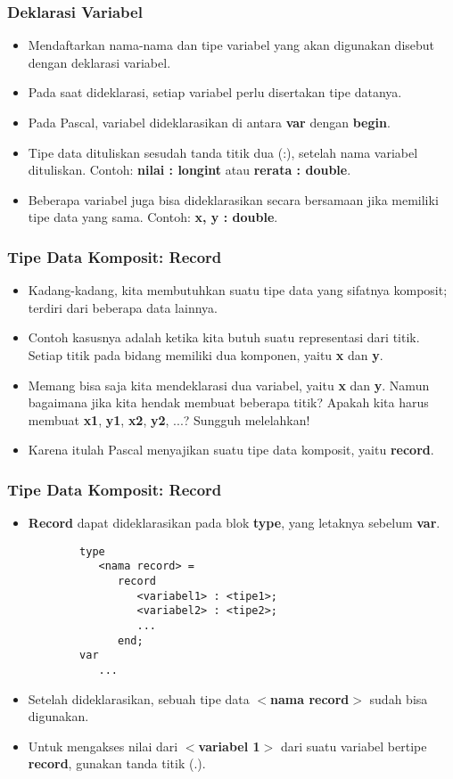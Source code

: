 \documentclass{beamer}
\begin{document}
\begin{frame}
\frametitle{Deklarasi Variabel}
\begin{itemize}
	\item Mendaftarkan nama-nama dan tipe variabel yang akan digunakan disebut dengan deklarasi variabel.
	\item Pada saat dideklarasi, setiap variabel perlu disertakan tipe datanya. 
	\item Pada Pascal, variabel dideklarasikan di antara \textbf{var} dengan \textbf{begin}.
	\item Tipe data dituliskan sesudah tanda titik dua (:), setelah nama variabel dituliskan. Contoh: \textbf{nilai : longint} atau \textbf{rerata : double}.
	\item Beberapa variabel juga bisa dideklarasikan secara bersamaan jika memiliki tipe data yang sama. Contoh: \textbf{x, y : double}.
\end{itemize}
\end{frame}

\begin{frame}
\frametitle{Tipe Data Komposit: Record}
\begin{itemize}
	\item Kadang-kadang, kita membutuhkan suatu tipe data yang sifatnya komposit; terdiri dari beberapa data lainnya.
	\item Contoh kasusnya adalah ketika kita butuh suatu representasi dari titik. Setiap titik pada bidang memiliki dua komponen, yaitu \textbf{x} dan \textbf{y}.
	\item Memang bisa saja kita mendeklarasi dua variabel, yaitu \textbf{x} dan \textbf{y}. Namun bagaimana jika kita hendak membuat beberapa titik? Apakah kita harus membuat \textbf{x1}, \textbf{y1}, \textbf{x2}, \textbf{y2}, ...? Sungguh melelahkan!
	\item Karena itulah Pascal menyajikan suatu tipe data komposit, yaitu \alert{\textbf{record}}. 
\end{itemize}
\end{frame}

\begin{frame}[fragile]
\frametitle{Tipe Data Komposit: Record}
\begin{itemize}
	\item \textbf{Record} dapat dideklarasikan pada blok \textbf{type}, yang letaknya sebelum \textbf{var}.
	\begin{lstlisting}
		type
		   <nama record> = 
		      record
		         <variabel1> : <tipe1>;
		         <variabel2> : <tipe2>;
		         ...
		      end;
		var
		   ...
	\end{lstlisting}
	\item Setelah dideklarasikan, sebuah tipe data \textbf{$<$nama record$>$} sudah bisa digunakan.
	\item Untuk mengakses nilai dari \textbf{$<$variabel 1$>$} dari suatu variabel bertipe \textbf{record}, gunakan tanda titik (.).
\end{itemize}
\end{frame}
\end{document}
